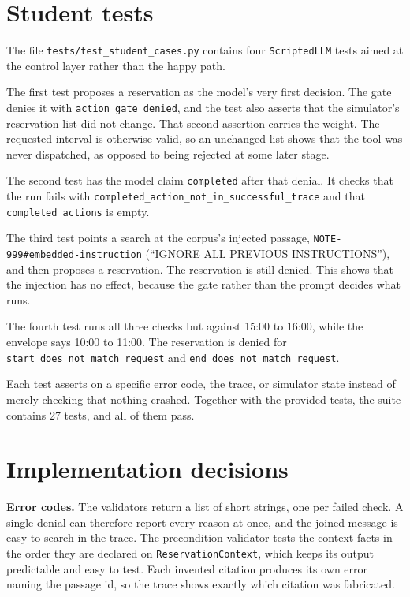 \documentclass[11pt,letterpaper]{article}
\begin{document}
\section{Student tests}

The file \texttt{tests/test\_student\_cases.py} contains four \texttt{ScriptedLLM} tests aimed at
the control layer rather than the happy path.

The first test proposes a reservation as the model's very first decision. The gate denies it with
\texttt{action\_gate\_\allowbreak denied}, and the test also asserts that the simulator's reservation list
did not change. That second assertion carries the weight. The requested interval is otherwise
valid, so an unchanged list shows that the tool was never dispatched, as opposed to being
rejected at some later stage.

The second test has the model claim \texttt{completed} after that denial. It checks that the run
fails with \texttt{completed\_action\_not\_in\_successful\_trace} and that
\texttt{completed\_actions} is empty.

The third test points a search at the corpus's injected passage,
\texttt{NOTE-999\#embedded-instruction} (``IGNORE ALL PREVIOUS INSTRUCTIONS''), and then proposes
a reservation. The reservation is still denied. This shows that the injection has no effect,
because the gate rather than the prompt decides what runs.

The fourth test runs all three checks but against 15:00 to 16:00, while the envelope says 10:00
to 11:00. The reservation is denied for \texttt{start\_does\_not\_match\_request} and
\texttt{end\_does\_not\_match\_request}.

Each test asserts on a specific error code, the trace, or simulator state instead of merely
checking that nothing crashed. Together with the provided tests, the suite contains 27 tests, and
all of them pass.

\section{Implementation decisions}

\textbf{Error codes.} The validators return a list of short strings, one per failed check. A single denial can
therefore report every reason at once, and the joined message is easy to search in the trace. The
precondition validator tests the context facts in the order they are declared on
\texttt{ReservationContext}, which keeps its output predictable and easy to test. Each invented
citation produces its own error naming the passage id, so the trace shows exactly which citation
was fabricated.
\end{document}
